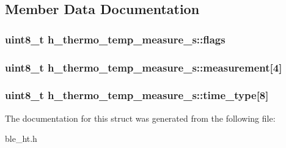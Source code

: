 \subsection{Member Data Documentation}
\hypertarget{structh__thermo__temp__measure__s_a7f97533e88c97363a67d7e5239d9583d}{
\subsubsection[{flags}]{\setlength{\rightskip}{0pt plus 5cm}uint8\-\_\-t h\-\_\-thermo\-\_\-temp\-\_\-measure\-\_\-s\-::flags}}\label{structh__thermo__temp__measure__s_a7f97533e88c97363a67d7e5239d9583d}
\hypertarget{structh__thermo__temp__measure__s_a5e89c0b96d36798f0119b2908a86cd2c}{
\subsubsection[{measurement}]{\setlength{\rightskip}{0pt plus 5cm}uint8\-\_\-t h\-\_\-thermo\-\_\-temp\-\_\-measure\-\_\-s\-::measurement\mbox{[}4\mbox{]}}}\label{structh__thermo__temp__measure__s_a5e89c0b96d36798f0119b2908a86cd2c}
\hypertarget{structh__thermo__temp__measure__s_a3614fbf11311510c4e65bca11b6033dd}{
\subsubsection[{time\-\_\-type}]{\setlength{\rightskip}{0pt plus 5cm}uint8\-\_\-t h\-\_\-thermo\-\_\-temp\-\_\-measure\-\_\-s\-::time\-\_\-type\mbox{[}8\mbox{]}}}\label{structh__thermo__temp__measure__s_a3614fbf11311510c4e65bca11b6033dd}


The documentation for this struct was generated from the following file\-:\begin{DoxyCompactItemize}
\item 
ble\-\_\-ht.\-h\end{DoxyCompactItemize}
